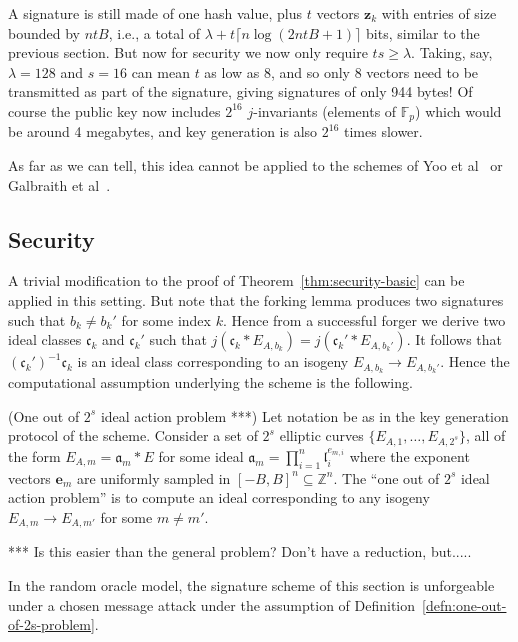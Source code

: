 \documentclass{llncs}
\newcommand{\F}{\mathbb{F}}
\newcommand{\Z}{\mathbb{Z}}
\renewcommand{\a}{\mathfrak{a}}
\renewcommand{\c}{\mathfrak{c}}
\renewcommand{\l}{\mathfrak{l}}
\newcommand{\e}{\textbf{e}}
\newcommand{\z}{\textbf{z}}
\begin{document}
A signature is still made of one hash value, plus $t$ vectors $\z_k$ with entries of size bounded by $ntB$, i.e., a total of $\lambda + t\lceil n\log(2ntB + 1)\rceil$ bits, similar to the previous section.
But now for security we now only require $ts \ge \lambda$.
Taking, say, $\lambda = 128$ and $s = 16$ can mean $t$ as low as 8, and so only 8 vectors need to be transmitted as part of the signature, giving signatures of only 944 bytes!
Of course the public key now includes $2^{16}$ $j$-invariants (elements of $\F_p$) which would be around 4 megabytes, and key generation is also $2^{16}$ times slower.


As far as we can tell, this idea cannot be applied to the schemes of Yoo et al~\cite{YAJJS17} or Galbraith et al~\cite{GPS17}.



\subsection{Security}

A trivial modification to the proof of Theorem~\ref{thm:security-basic} can be applied in this setting. But note that the forking lemma produces two signatures such that $b_k \ne b_k'$ for some index $k$.
Hence from a successful forger we derive two ideal classes $\c_k$ and $\c_k'$ such that $j( \c_k * E_{A, b_k} ) = j( \c_k' * E_{A, b_k'})$. It follows that $(\c_k')^{-1} \c_k$ is an ideal class corresponding to an isogeny $E_{A,b_k} \to E_{A,b_k'}$.
Hence the computational assumption underlying the scheme is the following.

\begin{definition}\label{defn:one-out-of-2s-problem}
(One out of $2^s$ ideal action problem ***)
Let notation be as in the key generation protocol of the scheme.
Consider a set of $2^s$ elliptic curves $\{ E_{A,1}, \dots, E_{A,2^s} \}$, all of the form $E_{A,m} = \a_m * E$ for some ideal $\a_m = \prod_{i=1}^n \l_i^{e_{m,i}}$ where the exponent vectors $\e_m $ are uniformly sampled in $[-B,B]^n \subseteq \Z^n$. The ``one out of $2^s$ ideal action problem'' is to compute an ideal corresponding to any isogeny $E_{A,m} \to E_{A,m'}$ for some $m \ne m'$.
\end{definition}


*** Is this easier than the general problem?  Don't have a reduction, but.....


\begin{theorem}
In the random oracle model, the signature scheme of this section is unforgeable under a chosen message attack under the assumption of Definition~\ref{defn:one-out-of-2s-problem}.
\end{theorem}
\end{document}
